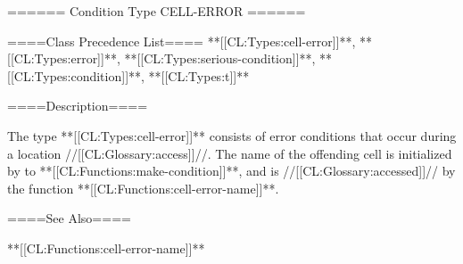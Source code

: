====== Condition Type CELL-ERROR ======

====Class Precedence List==== **[[CL:Types:cell-error]]**, **[[CL:Types:error]]**, **[[CL:Types:serious-condition]]**, **[[CL:Types:condition]]**, **[[CL:Types:t]]**

====Description====

The type **[[CL:Types:cell-error]]** consists of error conditions that occur during a location //[[CL:Glossary:access]]//. The name of the offending cell is initialized by  to **[[CL:Functions:make-condition]]**, and is //[[CL:Glossary:accessed]]// by the function **[[CL:Functions:cell-error-name]]**.

====See Also====

**[[CL:Functions:cell-error-name]]**

